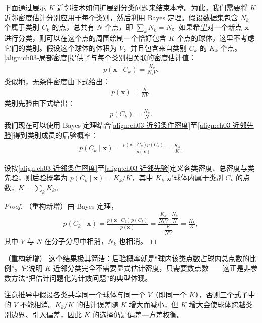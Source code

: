 \documentclass[../../main.tex]{subfiles}
\begin{document}
下面通过展示 $K$ 近邻技术如何扩展到分类问题来结束本章。为此，我们需要将 $K$ 近邻密度估计分别应用于每个类别，然后利用 Bayes 定理。假设数据集包含 $N_k$ 个属于类别 $C_k$ 的点，总共有 $N$ 个点，即 $\sum_k N_k=N$。如果希望对一个新点 $\boldsymbol{x}$ 进行分类，则可以在这个点的周围绘制一个恰好包含 $K$ 个点的球体，这里不考虑它们的类别。假设这个球体的体积为 $V$，并且包含来自类别 $C_k$ 的 $K_k$ 个点。\eqref{align:ch03-局部密度}提供了与每个类别相关联的密度估计值：
\begin{align}
p(\boldsymbol{x}\mid C_k)=\frac{K_k}{N_kV}.
\label{align:ch03-近邻条件密度}
\end{align}
类似地，无条件密度由下式给出：
\begin{align}
p(\boldsymbol{x})=\frac{K}{NV}.
\label{align:ch03-近邻无条件密度}
\end{align}
类别先验由下式给出：
\begin{align}
p(C_k)=\frac{N_k}{N}.
\label{align:ch03-近邻先验}
\end{align}
我们现在可以使用 Bayes 定理结合\eqref{align:ch03-近邻条件密度}至\eqref{align:ch03-近邻先验}得到类别成员的后验概率：
\begin{align}
p(C_k\mid\boldsymbol{x})=\frac{p(\boldsymbol{x}\mid C_k)p(C_k)}{p(\boldsymbol{x})}=\frac{K_k}{K}.
\label{align:ch03-近邻后验}
\end{align}

\begin{proposition}[$K$ 近邻分类的后验概率]\label{proposition:ch03-近邻分类}
设按\eqref{align:ch03-近邻条件密度}至\eqref{align:ch03-近邻先验}定义各类密度、总密度与类先验，则后验概率为 $p(C_k\mid\boldsymbol{x})=K_k/K$，其中 $K_k$ 是球体内属于类别 $C_k$ 的点数，$K=\sum_k K_k$。
\end{proposition}
\begin{proof}
（重构新增）由 Bayes 定理，
\begin{align*}
p(C_k\mid\boldsymbol{x})=\frac{p(\boldsymbol{x}\mid C_k)p(C_k)}{p(\boldsymbol{x})}=\frac{\dfrac{K_k}{N_kV}\cdot\dfrac{N_k}{N}}{\dfrac{K}{NV}}=\frac{K_k}{K},
\end{align*}
其中 $V$ 与 $N$ 在分子分母中相消，$N_k$ 也相消。
\end{proof}

\begin{remark}（重构新增）
这个结果极其简洁：后验概率就是“球内该类点数占球内总点数的比例”。它说明 $K$ 近邻分类完全不需要显式估计密度，只需要数点数——这正是非参数方法“把估计问题化为计数问题”的典型体现。

注意推导中假设各类共享同一个球体与同一个 $V$（即同一个 $K$），否则三个式子中的 $V$ 不能相消。$K_k/K$ 的估计误差随 $K$ 增大而减小，但 $K$ 增大会使球体跨越类别边界、引入偏差，因此 $K$ 的选择仍是偏差—方差权衡。
\end{remark}
\end{document}
